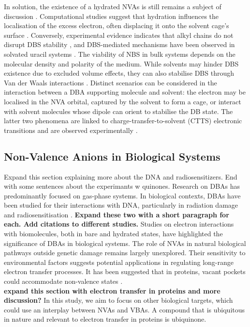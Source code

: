 In solution, the existence of a hydrated NVAs is still remains a subject of discussion \cite{anusiewicz2020fate,castellani2019stability}. Computational studies suggest that hydration influences the localisation of the excess electron, often displacing it onto the solvent cage's surface \cite{anusiewicz2020fate}. Conversely, experimental evidence indicates that alkyl chains do not disrupt DBS stability \cite{castellani2019stability}, and DBS-mediated mechanisms have been observed in solvated uracil systems \cite{narayanan2024electron}. The viability of NBS in bulk systems depends on the molecular density and polarity of the medium. While solvents may hinder DBS existence due to excluded volume effects, they can also stabilise DBS through Van der Waals interactions \cite{bradforth2002excited,chen2000precursors}. Distinct scenarios can be considered in the interaction between a DBA supporting molecule and solvent: the electron may be localised in the NVA orbital, captured by the solvent to form a cage, or interact with solvent molecules whose dipole can orient to stabilise the DB state. The latter two phenomena are linked to charge-transfer-to-solvent (CTTS) electronic transitions and are observed experimentally \cite{simons2023molecular,bradforth2002excited,chen2000precursors}.

\subsection{Non-Valence Anions in Biological Systems}
Expand this section explaining more about the DNA and radiosensitizers. End with some sentences about the experimants w quinones.
Research on DBAs has predominantly focused on gas-phase systems. In biological contexts, DBAs have been studied for their interactions with DNA, particularly in radiation damage and radiosensitisation \cite{gu2012interactions,narayanan2023secondary,sedmidubska2024interaction}.
\textbf{Expand these two with a short paragraph for each. Add citations to different studies.}
Studies on electron interactions with biomolecules, both in bare and hydrated states, have highlighted the significance of DBAs in biological systems. The role of NVAs in natural biological pathways outside genetic damage remains largely unexplored. Their sensitivity to environmental factors suggests potential applications in regulating long-range electron transfer processes. It has been suggested that in proteins, vacant pockets could accommodate non-valence states \cite{castellani2019stability}.\\
\textbf{expand this section with electron transfer in proteins and more discussion?}
In this study, we aim to focus on other biological targets, which could use an interplay between NVAs and VBAs. A compound that is ubiquitous in nature and relevant to electron transfer in proteins is ubiquinone.

